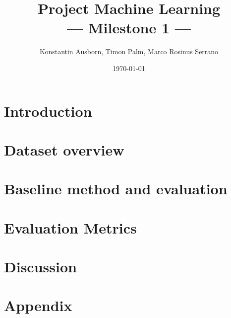 \documentclass[10pt,a4paper,twoside]{article}
\title{Project Machine Learning\\--- Milestone 1 ---}
\author{Konstantin Ausborn, Timon Palm, Marco Rosinus Serrano}
\date{\today}
\begin{document}
    \maketitle
    \section{Introduction}\label{sec:introduction}
    
    \section{Dataset overview}\label{sec:dataset-overview}
    
    \section{Baseline method and evaluation}\label{sec:baseline-method-and-evaluation}
    
    \section{Evaluation Metrics}\label{sec:evaluation-metrics}
    
    \section{Discussion}\label{sec:discussion}
    
    
    \section{Appendix}\label{sec:appendix}
    
\end{document}
